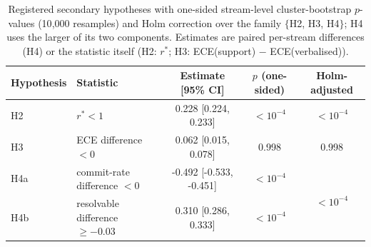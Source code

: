 \begin{table}[t]\centering\small
\caption{Registered secondary hypotheses with one-sided stream-level cluster-bootstrap $p$-values (10{,}000 resamples) and Holm correction over the family $\{$H2, H3, H4$\}$; H4 uses the larger of its two components. Estimates are paired per-stream differences (H4) or the statistic itself (H2: $r^*$; H3: ECE(support) $-$ ECE(verbalised)).}\label{tab:holm}
\begin{tabular}{llccc}
\toprule
Hypothesis & Statistic & Estimate [95\% CI] & $p$ (one-sided) & Holm-adjusted \\
\midrule
H2 & $r^*<1$ & 0.228 [0.224, 0.233] & $<10^{-4}$ & $<10^{-4}$ \\
H3 & ECE difference $<0$ & 0.062 [0.015, 0.078] & 0.998 & 0.998 \\
H4a & commit-rate difference $<0$ & -0.492 [-0.533, -0.451] & $<10^{-4}$ & \multirow{2}{*}{$<10^{-4}$} \\
H4b & resolvable difference $\ge -0.03$ & 0.310 [0.286, 0.333] & $<10^{-4}$ & \\
\bottomrule
\end{tabular}
\end{table}